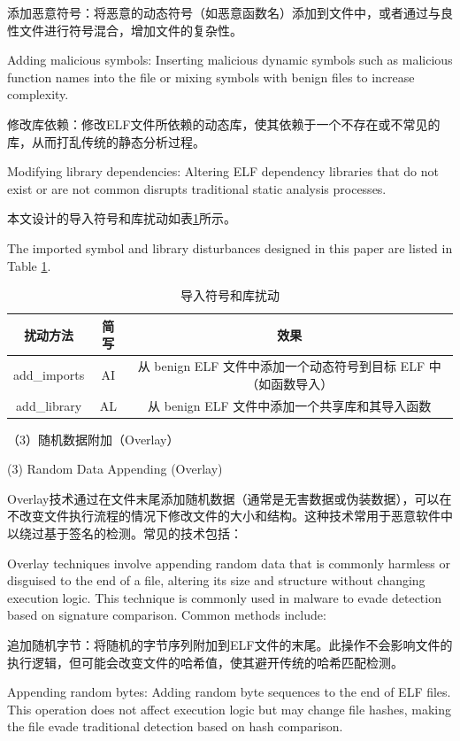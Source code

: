 添加恶意符号：将恶意的动态符号（如恶意函数名）添加到文件中，或者通过与良性文件进行符号混合，增加文件的复杂性。

Adding malicious symbols: Inserting malicious dynamic symbols such as malicious function names into the file or mixing symbols with benign files to increase complexity.

修改库依赖：修改ELF文件所依赖的动态库，使其依赖于一个不存在或不常见的库，从而打乱传统的静态分析过程。

Modifying library dependencies: Altering ELF dependency libraries that do not exist or are not common disrupts traditional static analysis processes.

本文设计的导入符号和库扰动如表\ref{tab:4.2}所示。

The imported symbol and library disturbances designed in this paper are listed in Table \ref{tab:4.2}.

\begin{table}[htbp]
	\centering
	\caption{导入符号和库扰动}\label{tab:4.2}
	\begin{tabular*}{\textwidth}{@{\extracolsep{\fill}}ccc}
		\toprule
		扰动方法 & 简写 & 效果 \\
		\midrule
		add\_imports & AI & 从 benign ELF 文件中添加一个动态符号到目标 ELF 中（如函数导入） \\
		add\_library & AL & 从 benign ELF 文件中添加一个共享库和其导入函数 \\
		\bottomrule
	\end{tabular*}
\end{table}


（3）随机数据附加（Overlay）

(3) Random Data Appending (Overlay)

Overlay技术通过在文件末尾添加随机数据（通常是无害数据或伪装数据），可以在不改变文件执行流程的情况下修改文件的大小和结构。这种技术常用于恶意软件中以绕过基于签名的检测。常见的技术包括：

Overlay techniques involve appending random data that is commonly harmless or disguised to the end of a file, altering its size and structure without changing execution logic. This technique is commonly used in malware to evade detection based on signature comparison. Common methods include:

追加随机字节：将随机的字节序列附加到ELF文件的末尾。此操作不会影响文件的执行逻辑，但可能会改变文件的哈希值，使其避开传统的哈希匹配检测。

Appending random bytes: Adding random byte sequences to the end of ELF files. This operation does not affect execution logic but may change file hashes, making the file evade traditional detection based on hash comparison.

